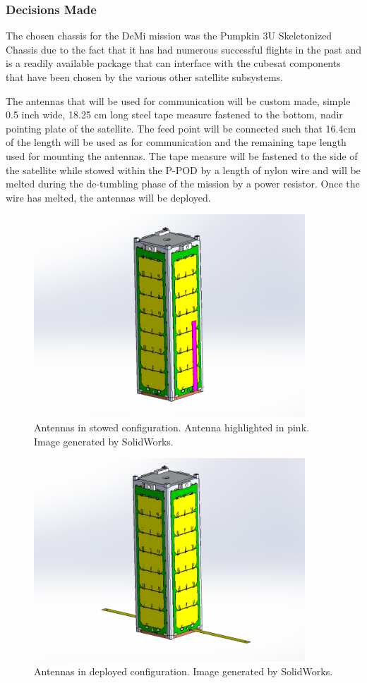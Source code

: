 \documentclass[12pt]{article}
\begin{document}
\subsubsection{Decisions Made}
The chosen chassis for the DeMi mission was the Pumpkin 3U Skeletonized Chassis due to the fact that it has had numerous successful flights in the past and is a readily available package that can interface with the cubesat components that have been chosen by the various other satellite subsystems.

The antennas that will be used for communication will be custom made, simple 0.5 inch wide, 18.25 cm long steel tape measure fastened to the bottom, nadir pointing plate of the satellite. The feed point will be connected such that 16.4cm of the length will be used as for communication and the remaining tape length used for mounting the antennas. The tape measure will be fastened to the side of the satellite while stowed within the P-POD by a length of nylon wire and will be melted during the de-tumbling phase of the mission by a power resistor. Once the wire has melted, the antennas will be deployed.

\begin{figure}[!ht]
\centering
\includegraphics[width=4in]{images/STR-4-Revised.png}
\caption{Antennas in stowed configuration. Antenna highlighted in pink. Image generated by SolidWorks.}
\label{fig:str-4}
\end{figure}

\begin{figure}[!ht]
\centering
\includegraphics[width=4in]{images/STR-5-Revised.png}
\caption{Antennas in deployed configuration. Image generated by SolidWorks.}
\label{fig:str-5}
\end{figure}
\end{document}

